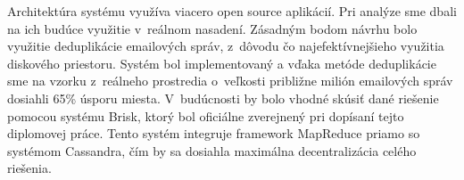 \documentclass[11pt,twoside,a4paper]{book}
\begin{document}
Architektúra systému využíva viacero open source aplikácií. Pri analýze sme dbali na ich budúce využitie v~reálnom nasadení. Zásadným bodom návrhu bolo využitie deduplikácie emailových správ, z~dôvodu čo najefektívnejšieho využitia diskového priestoru. Systém bol implementovaný a vďaka metóde deduplikácie sme na vzorku z~reálneho prostredia o~veľkosti približne milión emailových správ dosiahli 65\% úsporu miesta. V~budúcnosti by bolo vhodné skúsiť dané riešenie pomocou systému Brisk, ktorý bol oficiálne zverejnený pri dopísaní tejto diplomovej práce. Tento systém integruje framework MapReduce priamo so systémom Cassandra, čím by sa dosiahla maximálna decentralizácia celého riešenia.














%
{
\def\CS{$\cal C\kern-0.1667em\lower.5ex\hbox{$\cal S$}\kern-0.075em $}

}

%

\appendix


\end{document}
